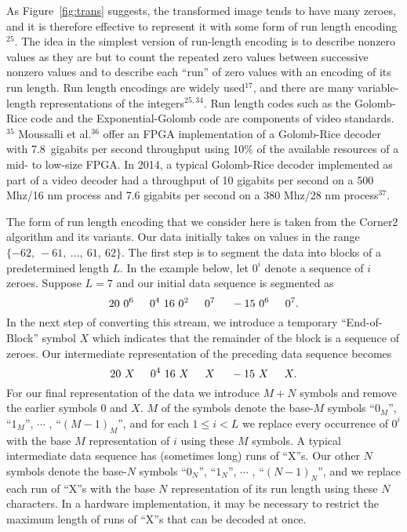 \documentclass{article}
\begin{document}
As Figure~\ref{fig:trans} suggests, the transformed image tends to have many
zeroes, and it is therefore effective to represent it with some form of 
run length encoding$^{25}$.  The idea in the simplest version of run-length
encoding is to describe nonzero values as they are but to count the repeated
zero values between successive nonzero values and to describe each ``run''
of zero values with an encoding of its run length.  Run length encodings
are widely used$^{17}$, and there are many variable-length representations
of the integers$^{25,34}$. 
Run length codes such as the Golomb-Rice code and the
Exponential-Golomb code are components of video standards.$^{35}$
Moussalli et al.$^{36}$ offer an FPGA implementation of a Golomb-Rice decoder
with 7.8~gigabits per second throughput using 10\% of the available resources
of a mid- to low-size FPGA.
In 2014, a typical Golomb-Rice decoder implemented as part of a video decoder
had a throughput of 10 gigabits per second on a 500 Mhz/16 nm process and
7.6 gigabits per second on a 380 Mhz/28 nm process$^{37}$.

The form of run length encoding that we consider here is taken from the
Corner2 algorithm and its variants.  Our data initially takes on values in
the range $\{-62, \ -61, \ \dots , \ 61, \ 62\}$.  The first step is to
segment the data into blocks of a predetermined length $L$.
In the example below, let $0^i$ denote a sequence of $i$ zeroes.
Suppose $L=7$ and our initial data sequence is segmented as
\begin{displaymath}
20 \ 0^6 \hspace*{.2in} 0^4 \ 16 \ 0^2 \hspace*{.2in} 0^7
\hspace*{.2in} -15 \ 0^6 \hspace*{.2in} 0^7.
\end{displaymath}
In the next step of converting this stream, we introduce a temporary 
``End-of-Block''
symbol $X$ which indicates that the remainder of the block is a sequence of
zeroes.  Our intermediate representation of the preceding data sequence
becomes
\begin{displaymath}
20 \ X \hspace*{.2in} 0^4 \ 16 \ X \hspace*{.2in} X
\hspace*{.2in} -15 \ X \hspace*{.2in} X.
\end{displaymath}
For our final representation of the data we introduce $M+N$ symbols
and remove the earlier symbols $0$ and $X$.  $M$ of the symbols denote
the base-$M$ symbols ``$0_M$'', ``$1_M$'', $\cdots$ , ``$(M-1)_M$'',
and for each $1 \leq i < L$ we replace every occurrence of $0^i$ with the
base $M$ representation of $i$ using these $M$ symbols.
A typical intermediate data sequence has (sometimes long) runs of ``X''s.
Our other $N$ symbols denote
the base-$N$ symbols ``$0_N$'', ``$1_N$'', $\cdots$ , ``$(N-1)_N$'',
and we replace each run of ``X''s with the base $N$ representation of its
run length using these $N$ characters.  In a hardware implementation, it may
be necessary to restrict the maximum length of runs of ``X''s that can be
decoded at once.
\end{document}
